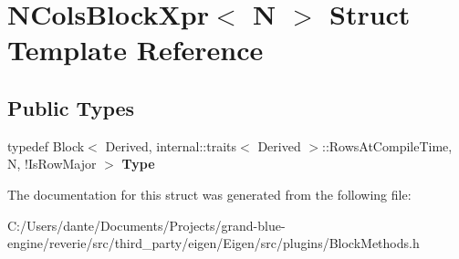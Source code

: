 \hypertarget{struct_n_cols_block_xpr}{}\section{N\+Cols\+Block\+Xpr$<$ N $>$ Struct Template Reference}
\label{struct_n_cols_block_xpr}
\subsection*{Public Types}
\begin{DoxyCompactItemize}
\item 
\mbox{\label{struct_n_cols_block_xpr_a921aa6f221f8f0036c04c8d0046f22dc}} 
typedef Block$<$ Derived, internal\+::traits$<$ Derived $>$\+::Rows\+At\+Compile\+Time, N, !Is\+Row\+Major $>$ {\bfseries Type}
\end{DoxyCompactItemize}


The documentation for this struct was generated from the following file\+:\begin{DoxyCompactItemize}
\item 
C\+:/\+Users/dante/\+Documents/\+Projects/grand-\/blue-\/engine/reverie/src/third\+\_\+party/eigen/\+Eigen/src/plugins/Block\+Methods.\+h\end{DoxyCompactItemize}
